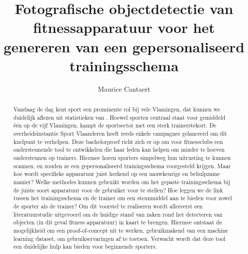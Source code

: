 \documentclass{hogent-article}
\title{Fotografische objectdetectie van fitnessapparatuur voor het genereren van een gepersonaliseerd trainingsschema}
\author{Maurice Cantaert}
\begin{document}
    \begin{abstract}
        Vandaag de dag kent sport een prominente rol bij vele Vlamingen, dat kunnen we duidelijk aflezen uit statistieken van \textcite{StatistiekVlaanderen2023} .
        Hoewel sporten centraal staat voor gemiddeld \'e\'en op de vijf Vlamingen, kampt de sportsector met een sterk trainerstekort. \autocite{SportVlaanderen2023}
        De overheidsinstantie Sport Vlaanderen heeft reeds enkele campagnes gelanceerd om dit knelpunt te verhelpen.
        Deze bachelorproef richt zich er op om voor fitnessclubs een ondersteunende tool te ontwikkelen die haar leden kan helpen om minder te hoeven ondersteunen op trainers.
        Hiermee horen sporters simpelweg hun uitrusting te kunnen scannen, en zouden ze een gepersonaliseerd trainingsschema voorgesteld krijgen.
        Maar hoe wordt specifieke apparatuur juist herkend op een nauwkeurige en behulpzame manier?
        Welke methodes kunnen gebruikt worden om het gepaste trainingsschema bij de juiste soort apparatuur voor de gebruiker voor te stellen?
        Hoe leggen we de link tussen het trainingsschema en de trainer om een steunmiddel aan te bieden voor zowel de sporter als de trainer?
        Om dit voorstel te realiseren wordt allereerst een literatuurstudie uitgevoerd om de huidige stand van zaken rond het detecteren van objecten (in dit geval fitness apparatuur) in kaart te brengen.
        Hiermee ontstaat de mogelijkheid om een proof-of-concept uit te werken, gebruikmakend van een machine learning dataset, om gebruikservaringen af te toetsen.
        Verwacht wordt dat deze tool een duidelijke hulp kan bieden voor beginnende sporters.
    \end{abstract}

    \tableofcontents

    

    \printbibliography[heading=bibintoc]
\end{document}
